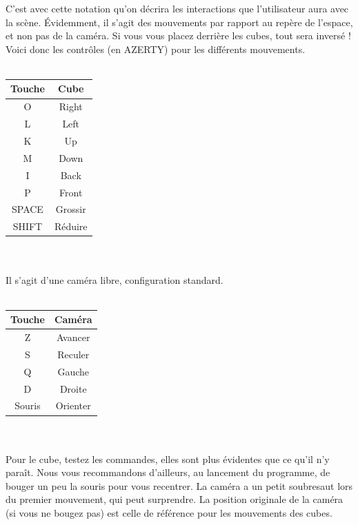 C'est avec cette notation qu'on décrira les interactions que l'utilisateur aura avec la scène. Évidemment, il s'agit des mouvements par rapport au repère de l'espace, et non pas de la caméra. Si vous vous placez derrière les cubes, tout sera inversé ! Voici donc les contrôles (en AZERTY) pour les différents mouvements.
\\\\
\begin{tabular}{| c | c |}
	\hline
	Touche & Cube \\\hline\hline
	O & Right \\\hline
	L & Left \\\hline
	K & Up \\\hline
	M & Down \\\hline
	I & Back \\\hline
	P & Front \\\hline
	SPACE & Grossir \\\hline
	SHIFT & Réduire \\\hline
\end{tabular}
\\\\
Il s'agit d'une caméra libre, configuration standard.
\\\\
\begin{tabular}{| c | c |}
	\hline
	Touche & Caméra \\\hline\hline
	Z & Avancer \\\hline
	S & Reculer \\\hline
	Q & Gauche \\\hline
	D & Droite \\\hline
	Souris & Orienter \\\hline
\end{tabular}
\\\\
Pour le cube, testez les commandes, elles sont plus évidentes que ce qu'il n'y paraît. Nous vous recommandons d'ailleurs, au lancement du programme, de bouger un peu la souris pour vous recentrer. La caméra a un petit soubresaut lors du premier mouvement, qui peut surprendre. La position originale de la caméra (si vous ne bougez pas) est celle de référence pour les mouvements des cubes.